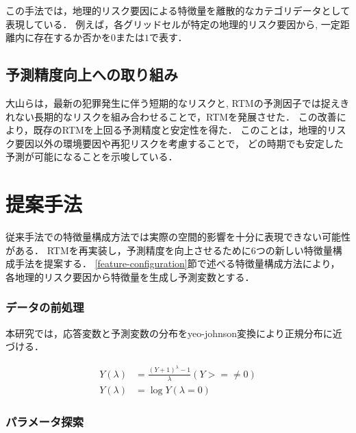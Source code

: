 \documentclass[12pt,a4paper,oneside]{jsbook}
\theoremstyle{plain}
\begin{document}
この手法では，地理的リスク要因による特徴量を離散的なカテゴリデータとして表現している．
例えば，各グリッドセルが特定の地理的リスク要因から,
一定距離内に存在するか否かを$0$または$1$で表す．
\section{予測精度向上への取り組み}
大山ら\citep{大山智也2020短期的}は，最新の犯罪発生に伴う短期的なリスクと,
RTMの予測因子では捉えきれない長期的なリスクを組み合わせることで，RTMを発展させた．
この改善により，既存のRTMを上回る予測精度と安定性を得た．
このことは，地理的リスク要因以外の環境要因や再犯リスクを考慮することで，
どの時期でも安定した予測が可能になることを示唆している．

\chapter{提案手法}
\label{chapter_3}
従来手法\citep{caplan2015risk}での特徴量構成方法では実際の空間的影響を十分に表現できない可能性がある．
RTM\citep{caplan2015risk}を再実装し，予測精度を向上させるために6つの新しい特徴量構成手法を提案する．
\ref{feature-configuration}節で述べる特徴量構成方法により，
各地理的リスク要因から特徴量を生成し予測変数とする．
\subsection{データの前処理}

本研究では，応答変数と予測変数の分布をyeo-johnson変換\citep{weisberg2001yeo}により正規分布に近づける．

\begin{align}\label{yeojohnson}
  Y(\lambda) &= \frac{(Y+1)^\lambda-1}{\lambda} (Y >= \neq 0) \\
  Y(\lambda) &= \log{Y} (\lambda = 0)
\end{align}

\subsection{パラメータ探索}

\end{document}
